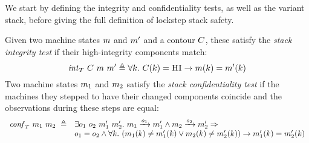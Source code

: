 \documentclass[acmsmall,review,anonymous]{acmart}\settopmatter{printfolios=true,printccs=false,printacmref=false}
\begin{document}
{We start by defining the integrity and confidentiality tests, as well
as the variant stack, before giving the full definition of lockstep
stack safety.

\newcommand{\vse}{\mathit{vse}}
\newcommand{\VSES}{\mathit{VSE}}
\newcommand{\vs}{\mathit{vs}}
\newcommand{\VSS}{\mathit{VS}}

\newcommand*{\vm}[1]{\ensuremath{\mathit{vm}_{#1}}}
\newcommand*{\testInt}[3]{\ensuremath{\mathit{int}_T ~ #1 ~ #2 ~ #3}}
\newcommand*{\testConf}[2]{\ensuremath{\mathit{conf}_T ~ #1 ~ #2}}
\newcommand*{\testVS}[2]{\ensuremath{\mathit{\vs}_T ~ #1 ~ #2}}
\newcommand*{\testProp}[3]{\ensuremath{\mathit{stack}_T ~ #1 ~ #2 ~ #3}}

  Given two machine states $m$ and $m'$ and a contour $C$, these
  satisfy the \emph{stack integrity test} if their high-integrity components
  match:
  \[
    \testInt{\contour}{\mach}{\mach'} \triangleq
    \forall \component . ~
    \contour(\component) = \HIGHINT \rightarrow
    \mach(\component) = \mach'(\component)
    \]
    \ifaftersubmission
{}
\fi
{} Two machine states $m_1$ and $m_2$ satisfy the
\emph{stack confidentiality test} if the machines they stepped to
have their changed components coincide and the observations during
these steps are equal:
\[
\begin{array}{rl}
  \mathit{conf}_T ~ m_1 ~ m_2 ~ \triangleq &
  \exists o_1 ~ o_2 ~ m_1' ~ m_2'. ~
  m_1 \xrightarrow{o_1} m_1' \wedge m_2 \xrightarrow{o_2} m_2' \Rightarrow \\
&    o_1 = o_2 \wedge \forall k . ~
   (     m_1(k) \neq m_1'(k)
    \vee m_2(k) \neq m_2'(k))
    \rightarrow m_1'(k) = m_2'(k)
\end{array}
\]
\ifaftersubmission
{}
\fi

}
\end{document}
